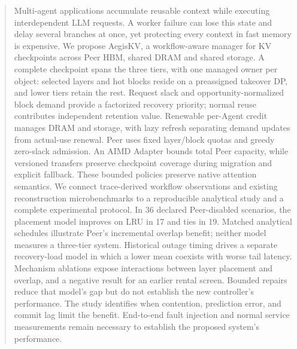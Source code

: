 \begin{abstract}
Multi-agent applications accumulate reusable context while executing
interdependent LLM requests. A worker failure can lose this state and delay
several branches at once, yet protecting every context in fast memory is
expensive. We propose AegisKV, a workflow-aware manager for KV checkpoints
across Peer HBM, shared DRAM and shared storage. A complete checkpoint
spans the three tiers, with one managed owner per object: selected layers
and hot blocks reside on a preassigned takeover DP, and lower tiers
retain the rest. Request slack and opportunity-normalized block demand
provide a factorized recovery priority; normal reuse contributes independent
retention value. Renewable per-Agent credit manages DRAM and storage,
with lazy refresh separating demand updates from actual-use renewal.
Peer uses fixed layer/block quotas and greedy zero-slack admission.
An AIMD Adapter bounds total Peer capacity, while versioned transfers
preserve checkpoint coverage during migration and explicit fallback.
These bounded policies preserve native attention semantics. We connect trace-derived
workflow observations and existing reconstruction microbenchmarks to a
reproducible analytical study and a complete experimental protocol.
In 36 declared Peer-disabled scenarios, the placement model improves on
LRU in 17 and ties in 19. Matched analytical schedules illustrate Peer's
incremental overlap benefit; neither model measures a three-tier system. Historical outage timing drives a separate recovery-load model in which
a lower mean coexists with worse tail latency. Mechanism ablations expose
interactions between layer placement and overlap, and a negative result
for an earlier rental screen. Bounded repairs reduce that model's gap
but do not establish the new controller's performance. The study
identifies when contention, prediction error, and commit
lag limit the benefit. End-to-end fault injection and normal
service measurements remain necessary to establish the proposed system's
performance.
\end{abstract}
